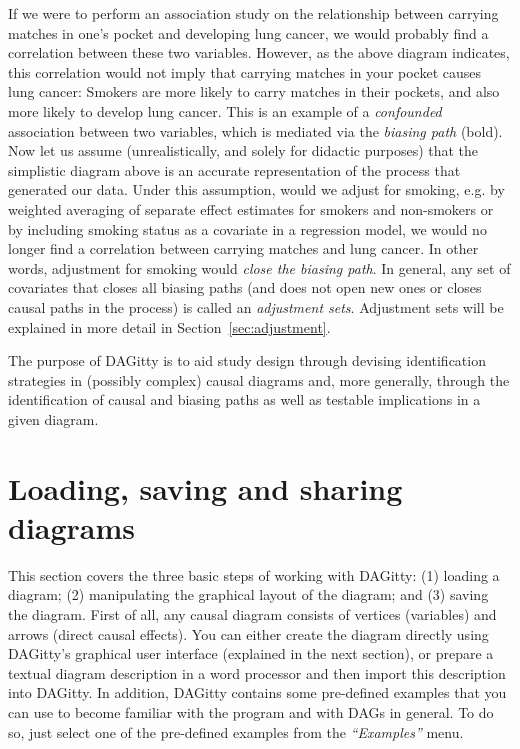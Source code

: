 \documentclass[a4paper]{article} %
\newcommand{\pp}{{\sc DAG}itty\xspace}
\newcommand{\action}[1]{\emph{``#1''}}
\begin{document}
If we were to perform an association 
study on the relationship between carrying matches
in one's pocket and developing lung cancer, we would probably find a 
correlation between these two variables. However, as the above diagram
indicates, this correlation would not imply that carrying matches in 
your pocket causes lung cancer: Smokers are more likely to carry matches
in their pockets, and also more likely to develop lung cancer. This is an
example of a \emph{confounded} association between two variables,
which is mediated via the \emph{biasing path} (bold). 
Now let us assume (unrealistically, and solely for didactic purposes) 
that the simplistic diagram above is an accurate representation of the
process that generated our data. Under this assumption, would we adjust for smoking, 
e.g. by weighted averaging of separate effect estimates for 
smokers and non-smokers or by including smoking status as a covariate
in a regression model, we would  
no longer find a correlation between carrying matches and lung cancer.
In other words, adjustment for smoking would \emph{close the biasing path}.
In general, any set of covariates that closes all biasing paths (and does
not open new ones or closes causal paths in the process) is called an 
\emph{adjustment sets}.  Adjustment sets will be explained in more detail in 
Section~\ref{sec:adjustment}.

The purpose of \pp is to aid study design through devising identification
strategies in (possibly complex) causal diagrams and,
more generally, through the identification of causal and biasing paths as
well as testable implications in a given diagram. 

\section{Loading, saving  and sharing diagrams}

\label{sec:diagramcreation}

This section covers the three basic steps of working with \pp: 
(1) loading a diagram; (2) manipulating the graphical layout of the diagram; and
(3) saving the diagram. 
First of all, any causal diagram consists of vertices (variables) and arrows 
(direct causal effects).
You can either create the diagram directly using \pp's graphical user
interface (explained in the next section),
or prepare a textual diagram description in a word processor 
and then import this
description into \pp. In addition, \pp
contains some pre-defined examples that you can use to become familiar
with the program and with DAGs in general. 
To do so, just select one of the pre-defined examples from
the \action{Examples} menu.
\end{document}

